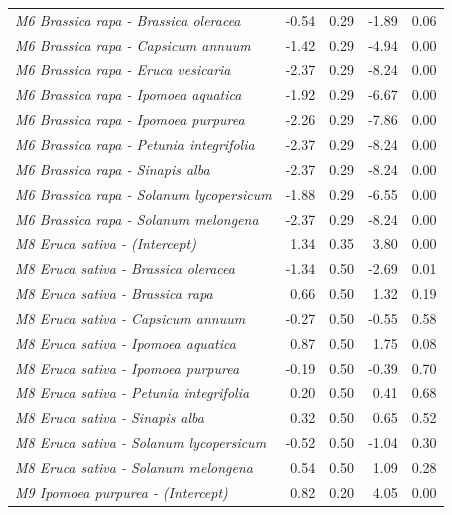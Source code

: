 \documentclass[
  12pt,
]{article}
\begin{document}
\begin{longtable}[t]{>{\em}lrrrr}
\addlinespace
M6 Brassica rapa - Brassica oleracea & -0.54 & 0.29 & -1.89 & 0.06\\
\addlinespace
\rowcolor{gray!6}  M6 Brassica rapa - Capsicum annuum & -1.42 & 0.29 & -4.94 & 0.00\\
\addlinespace
M6 Brassica rapa - Eruca vesicaria & -2.37 & 0.29 & -8.24 & 0.00\\
\addlinespace
\rowcolor{gray!6}  M6 Brassica rapa - Ipomoea aquatica & -1.92 & 0.29 & -6.67 & 0.00\\
\addlinespace
M6 Brassica rapa - Ipomoea purpurea & -2.26 & 0.29 & -7.86 & 0.00\\
\addlinespace
\rowcolor{gray!6}  M6 Brassica rapa - Petunia integrifolia & -2.37 & 0.29 & -8.24 & 0.00\\
\addlinespace
M6 Brassica rapa - Sinapis alba & -2.37 & 0.29 & -8.24 & 0.00\\
\addlinespace
\rowcolor{gray!6}  M6 Brassica rapa - Solanum lycopersicum & -1.88 & 0.29 & -6.55 & 0.00\\
\addlinespace
M6 Brassica rapa - Solanum melongena & -2.37 & 0.29 & -8.24 & 0.00\\
\addlinespace
\rowcolor{gray!6}  M8 Eruca sativa - (Intercept) & 1.34 & 0.35 & 3.80 & 0.00\\
\addlinespace
M8 Eruca sativa - Brassica oleracea & -1.34 & 0.50 & -2.69 & 0.01\\
\addlinespace
\rowcolor{gray!6}  M8 Eruca sativa - Brassica rapa & 0.66 & 0.50 & 1.32 & 0.19\\
\addlinespace
M8 Eruca sativa - Capsicum annuum & -0.27 & 0.50 & -0.55 & 0.58\\
\addlinespace
\rowcolor{gray!6}  M8 Eruca sativa - Ipomoea aquatica & 0.87 & 0.50 & 1.75 & 0.08\\
\addlinespace
M8 Eruca sativa - Ipomoea purpurea & -0.19 & 0.50 & -0.39 & 0.70\\
\addlinespace
\rowcolor{gray!6}  M8 Eruca sativa - Petunia integrifolia & 0.20 & 0.50 & 0.41 & 0.68\\
\addlinespace
M8 Eruca sativa - Sinapis alba & 0.32 & 0.50 & 0.65 & 0.52\\
\addlinespace
\rowcolor{gray!6}  M8 Eruca sativa - Solanum lycopersicum & -0.52 & 0.50 & -1.04 & 0.30\\
\addlinespace
M8 Eruca sativa - Solanum melongena & 0.54 & 0.50 & 1.09 & 0.28\\
\addlinespace
\rowcolor{gray!6}  M9 Ipomoea purpurea - (Intercept) & 0.82 & 0.20 & 4.05 & 0.00\\

\end{longtable}
\end{document}
